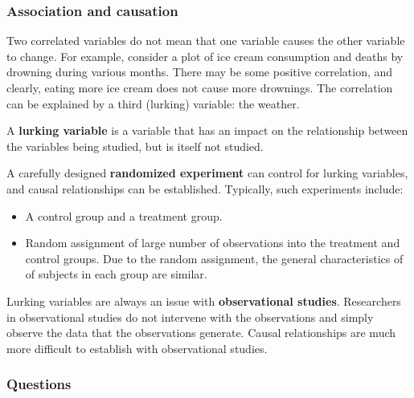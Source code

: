 \documentclass[
]{book}
\providecommand{\tightlist}{%
  \setlength{\itemsep}{0pt}\setlength{\parskip}{0pt}}
\begin{document}
\hypertarget{association-and-causation}{%
\subsubsection{Association and causation}\label{association-and-causation}}

Two correlated variables do not mean that one variable causes the other variable to change. For example, consider a plot of ice cream consumption and deaths by drowning during various months. There may be some positive correlation, and clearly, eating more ice cream does not cause more drownings. The correlation can be explained by a third (lurking) variable: the weather.

A \textbf{lurking variable} is a variable that has an impact on the relationship between the variables being studied, but is itself not studied.

A carefully designed \textbf{randomized experiment} can control for lurking variables, and causal relationships can be established. Typically, such experiments include:

\begin{itemize}
\tightlist
\item
  A control group and a treatment group.
\item
  Random assignment of large number of observations into the treatment and control groups. Due to the random assignment, the general characteristics of of subjects in each group are similar.
\end{itemize}

Lurking variables are always an issue with \textbf{observational studies}. Researchers in observational studies do not intervene with the observations and simply observe the data that the observations generate. Causal relationships are much more difficult to establish with observational studies.

\hypertarget{questions-1}{%
\subsubsection{Questions}\label{questions-1}}
\end{document}
